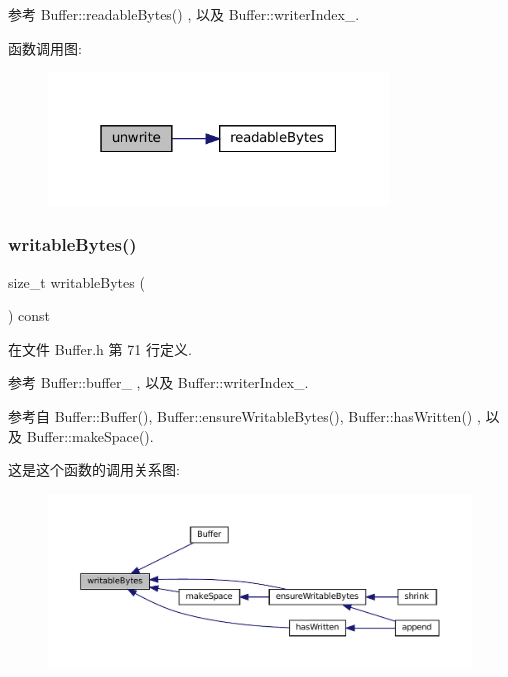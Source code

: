 参考 Buffer\+::readable\+Bytes() , 以及 Buffer\+::writer\+Index\+\_\+.

函数调用图\+:
\nopagebreak
\begin{figure}[H]
\begin{center}
\leavevmode
\includegraphics[width=256pt]{classmuduo_1_1net_1_1Buffer_a851a742d16106f81629a5315d80e0616_cgraph}
\end{center}
\end{figure}
\mbox{\label{classmuduo_1_1net_1_1Buffer_a998888da42aba8e7ff1977405f7c33e3}} 
\subsubsection{\texorpdfstring{writable\+Bytes()}{writableBytes()}}
{\footnotesize\ttfamily size\+\_\+t writable\+Bytes (\begin{DoxyParamCaption}{ }\end{DoxyParamCaption}) const\hspace{0.3cm}{\ttfamily [inline]}}



在文件 Buffer.\+h 第 71 行定义.



参考 Buffer\+::buffer\+\_\+ , 以及 Buffer\+::writer\+Index\+\_\+.



参考自 Buffer\+::\+Buffer(), Buffer\+::ensure\+Writable\+Bytes(), Buffer\+::has\+Written() , 以及 Buffer\+::make\+Space().

这是这个函数的调用关系图\+:
\nopagebreak
\begin{figure}[H]
\begin{center}
\leavevmode
\includegraphics[width=350pt]{classmuduo_1_1net_1_1Buffer_a998888da42aba8e7ff1977405f7c33e3_icgraph}
\end{center}
\end{figure}


